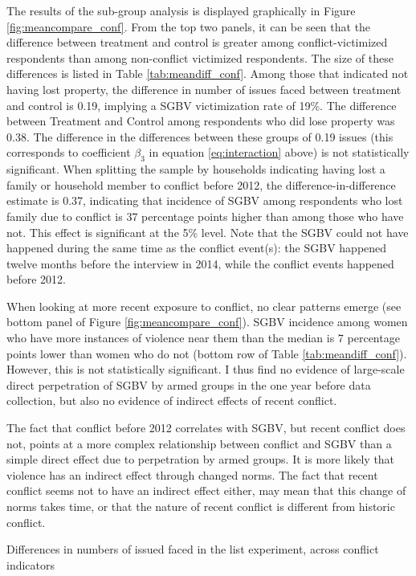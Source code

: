 The results of the sub-group analysis is displayed graphically in Figure \ref{fig:meancompare_conf}. From the top two panels, it can be seen that the difference between treatment and control is greater among conflict-victimized respondents than among non-conflict victimized respondents. The size of these differences is listed in Table \ref{tab:meandiff_conf}. Among those that indicated not having lost property, the difference in number of issues faced between treatment and control is 0.19, implying a SGBV victimization rate of 19\%. The difference between Treatment and Control among respondents who did lose property was 0.38. The difference in the differences between these groups of 0.19 issues (this corresponds to coefficient $\beta_3$ in equation \ref{eq:interaction} above) is not statistically significant. When splitting the sample by households indicating having lost a family or household member to conflict before 2012, the difference-in-difference estimate is 0.37, indicating that incidence of SGBV among respondents who lost family due to conflict is 37 percentage points higher than among those who have not. This effect is significant at the 5\% level. Note that the SGBV could not have happened during the same time as the conflict event(s): the SGBV happened twelve months before the interview in 2014, while the conflict events happened before 2012.

When looking at more recent exposure to conflict, no clear patterns emerge (see bottom panel of Figure \ref{fig:meancompare_conf}). SGBV incidence among women who have more instances of violence near them than the median is 7 percentage points lower than women who do not (bottom row of Table \ref{tab:meandiff_conf}). However, this is not statistically significant. I thus find no evidence of large-scale direct perpetration of SGBV by armed groups in the one year before data collection, but also no evidence of indirect effects of recent conflict. 

The fact that conflict before 2012 correlates with SGBV, but recent conflict does not, points at a more complex relationship between conflict and SGBV than a simple direct effect due to perpetration by armed groups. It is more likely that violence has an indirect effect through changed norms. The fact that recent conflict seems not to have an indirect effect either, may mean that this change of norms takes time, or that the nature of recent conflict is different from historic conflict. 

\begin{table}[htb]
\caption{Differences in numbers of issued faced in the list experiment, across conflict indicators}
\label{tab:meandiff_conf}
\end{table}

